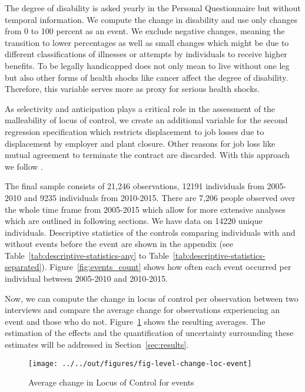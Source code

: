 \documentclass[12pt, a4paper, fleqn, parskip]{scrartcl}
\begin{document}
The degree of disability is asked yearly in the Personal Questionnaire but without
temporal information. We compute the change in disability and use only changes from 0 to
100 percent as an event. We exclude negative changes, meaning the transition to lower
percentages as well as small changes which might be due to different classifications of
illnesses or attempts by individuals to receive higher benefits. To be legally
handicapped does not only mean to live without one leg but also other forms of health
shocks like cancer affect the degree of disability. Therefore, this variable serves more
as proxy for serious health shocks.

As selectivity and anticipation plays a critical role in the assessment of the
malleability of locus of control, we create an additional variable for the second
regression specification which restricts displacement to job losses due to displacement
by employer and plant closure. Other reasons for job loss like mutual agreement to
terminate the contract are discarded. With this approach we follow \citet{preuss2017}.

The final sample consists of 21,246 observations, 12191 individuals from 2005-2010 and
9235 individuals from 2010-2015. There are 7,206 people observed over the whole time
frame from 2005-2015 which allow for more extensive analyses which are outlined in
following sections. We have data on 14220 unique individuals. Descriptive statistics of
the controls comparing individuals with and without events before the event are shown in
the appendix (see Table~\ref{tab:descriptive-statistics-any} to
Table~\ref{tab:descriptive-statistics-separated}). Figure~\ref{fig:events_count} shows
how often each event occurred per individual between 2005-2010 and 2010-2015.

Now, we can compute the change in locus of control per observation between two
interviews and compare the average change for observations experiencing an event and
those who do not. Figure~\ref{fig:level-change-loc-event} shows the resulting averages.
The estimation of the effects and the quantification of uncertainty surrounding these
estimates will be addressed in Section~\ref{sec:results}.

\begin{figure}[H]
    \centering
    \texttt{[image: ../../out/figures/fig-level-change-loc-event]}
    \caption{Average change in Locus of Control for events}
    \label{fig:level-change-loc-event}
\end{figure}
\end{document}
